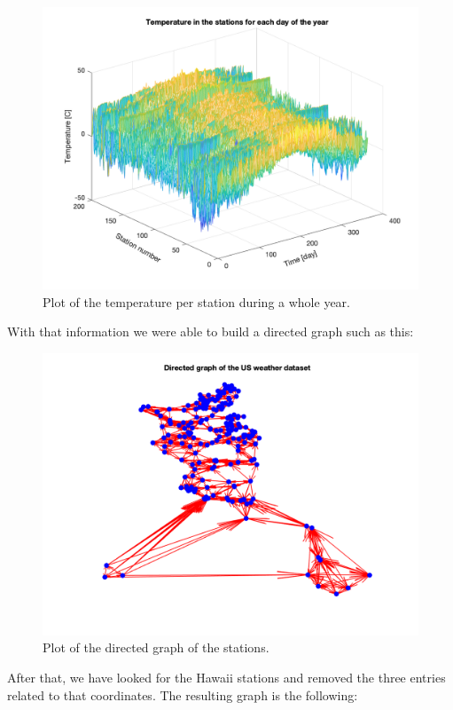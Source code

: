 \documentclass[12pt]{article}
\begin{document}
\begin{figure}[H]
	\centering
	\includegraphics[width=13cm]{images/1.png}
	\caption{Plot of the temperature per station during a whole year.}
	\label{fig:temperaturePlot}
\end{figure}

With that information we were able to build a directed graph such as this:
\begin{figure}[H]
	\centering
	\includegraphics[width=13cm]{images/2.png}
	\caption{Plot of the directed graph of the stations.}
	\label{fig:directedGraph}
\end{figure}

After that, we have looked for the Hawaii stations and removed the three entries related to that coordinates. The resulting graph is the following:
\end{document}
